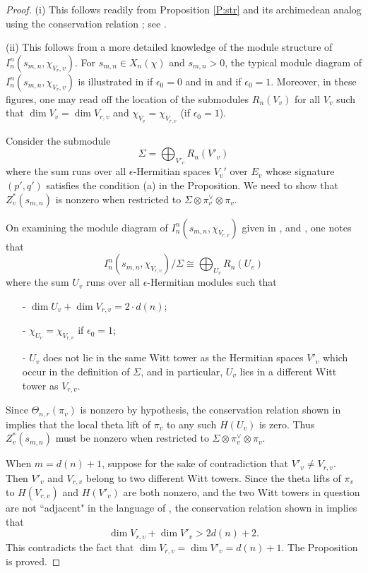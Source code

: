 \documentclass[10pt]{amsart}
\theoremstyle{plain}
\numberwithin{equation}{section}
\begin{document}
  
 \begin{proof}
(i) This follows readily from Proposition
 \ref{P:str} and its archimedean analog using the conservation relation \cite{SZ};  see \cite[Lemma
 8.6]{Y4}. 
 \vskip 5pt
 
 \noindent (ii) This follows from a more detailed knowledge of the
 module structure of $I_n^n(s_{m,n}, \chi_{V_r,v})$. 
 For $s_{m,n} \in X_n(\chi)$ and $s_{m,n} >0$, the typical
 module diagram of $I_n^n(s_{m,n}, \chi_{V_r,v})$ is illustrated in
 \cite[Figure 4]{LZ1}  if $\epsilon_0 = 0$ and in \cite[Figure 5]{LZ2} and \cite[\S 6.1, \S 6.2]{LZ4}
 if $\epsilon_0  =1$. Moreover, in these figures, one may read off the
 location of the submodules $R_n(V_v)$ for all $V_v$ such that $\dim V_v =
 \dim V_{r,v}$ and $\chi_{V_v} = \chi_{V_{r,v}}$ (if $\epsilon_0  =1$).
\vskip 5pt 

Consider the submodule 
\[  \Sigma = \bigoplus_{V'_v}  R_n(V'_v) \]
where the sum runs over all   $\epsilon$-Hermitian spaces $V_v'$  over
$E_v$ whose signature $(p',q')$ satisfies the condition (a) in the
Proposition. We need to show that $Z_v^*(s_{m,n})$ is  nonzero when
restricted to $\Sigma \otimes \pi_v^{\vee} \otimes \pi_v$.

 On examining the module diagram of $I_n^n(s_{m,n}, \chi_{V_{r,v}})$
 given in \cite[Figure 4]{LZ1}, \cite[Figure 5]{LZ2} and \cite[\S 6.1, \S 6.2]{LZ4}, one notes
 that 
 \[  I_n^n(s_{m,n}, \chi_{V_{r,v}})/ \Sigma \cong \bigoplus_{U_v}  R_n(U_v) \]
 where the sum $U_v$ runs over all $\epsilon$-Hermitian modules such that
 \begin{itemize}
 \item[-] $\dim U_v + \dim V_{r,v} = 2 \cdot d(n)$;
 \item[-] $\chi_{U_v} = \chi_{V_{r,v}}$ if $\epsilon_0 = 1$;
 \item[-] $U_v$ does not lie in the same Witt tower as the Hermitian spaces $V'_v$ which 
 occur in the definition of $\Sigma$, and in particular, $U_v$ lies in a different Witt tower as $V_{r,v}$.
 \end{itemize}
 Since $\Theta_{n,r}(\pi_v)$ is nonzero by hypothesis, the
 conservation relation shown in \cite{SZ} implies that the local theta lift of
 $\pi_v$ to any such $H(U_v)$ is zero. Thus  
 $Z_v^*(s_{m,n})$ must be  nonzero when restricted to $\Sigma \otimes
 \pi_v^{\vee} \otimes \pi_v$.  
 \vskip 5pt
 
 When $m = d(n) +1$, suppose for the sake of contradiction that $V'_v
 \ne V_{r,v}$. Then $V'_v$ and $V_{r,v}$ belong to two different Witt
 towers. Since the theta lifts of $\pi_v$ to $H(V_{r,v})$ and
 $H(V'_v)$ are both nonzero,  and the two Witt towers in question are
 not ``adjacent" in the language of \cite{SZ}, the conservation
 relation shown in \cite{SZ} implies that
 \[  \dim V_{r,v} + \dim V'_v > 2 d(n) +2. \]
 This contradicts the fact that $\dim V_{r,v} = \dim V'_v = d(n) +1$. 
 The Proposition is proved. 
  \end{proof}
 \vskip 5pt
   
\end{document}
